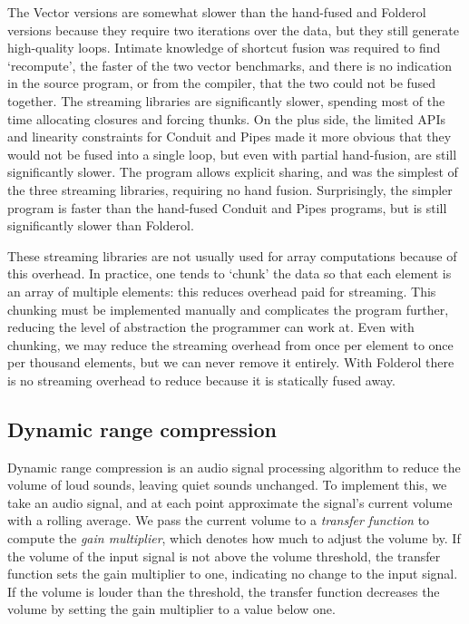 The Vector versions are somewhat slower than the hand-fused and Folderol versions because they require two iterations over the data, but they still generate high-quality loops.
Intimate knowledge of shortcut fusion was required to find `recompute', the faster of the two vector benchmarks, and there is no indication in the source program, or from the compiler, that the two could not be fused together.
The streaming libraries are significantly slower, spending most of the time allocating closures and forcing thunks.
On the plus side, the limited APIs and linearity constraints for Conduit and Pipes made it more obvious that they would not be fused into a single loop, but even with partial hand-fusion, are still significantly slower.
The \Streaming program allows explicit sharing, and was the simplest of the three streaming libraries, requiring no hand fusion.
Surprisingly, the simpler \Streaming program is faster than the hand-fused Conduit and Pipes programs, but is still significantly slower than Folderol.


These streaming libraries are not usually used for array computations because of this overhead.
In practice, one tends to `chunk' the data so that each element is an array of multiple elements: this reduces overhead paid for streaming.
This chunking must be implemented manually and complicates the program further, reducing the level of abstraction the programmer can work at.
Even with chunking, we may reduce the streaming overhead from once per element to once per thousand elements, but we can never remove it entirely.
With Folderol there is no streaming overhead to reduce because it is statically fused away.


\subsection{Dynamic range compression}
Dynamic range compression is an audio signal processing algorithm to reduce the volume of loud sounds, leaving quiet sounds unchanged.
To implement this, we take an audio signal, and at each point approximate the signal's current volume with a rolling average.
We pass the current volume to a \emph{transfer function} to compute the \emph{gain multiplier}, which denotes how much to adjust the volume by.
If the volume of the input signal is not above the volume threshold, the transfer function sets the gain multiplier to one, indicating no change to the input signal.
If the volume is louder than the threshold, the transfer function decreases the volume by setting the gain multiplier to a value below one.

